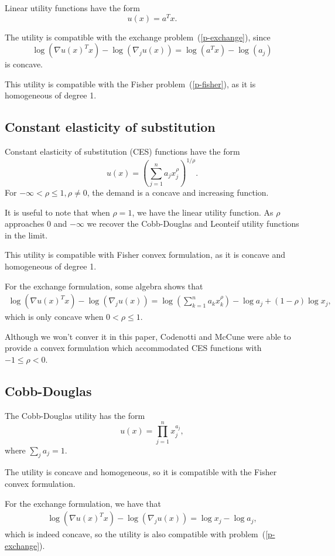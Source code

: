 \documentclass[12pt]{article}
\begin{document}
Linear utility functions have the form
\[
u(x) = a^T x.
\]

The utility is compatible with the exchange problem~(\ref{p-exchange}),
since
\[
\log(\nabla u(x)^T x) - \log(\nabla_j u(x))  = \log(a^T x) - \log(a_j)
\]
is concave.

This utility is compatible with the Fisher problem~(\ref{p-fisher}), as it is homogeneous of degree 1.


\subsection{Constant elasticity of substitution}
Constant elasticity of substitution (CES) functions have the form
\[
u(x) = \left(\sum_{j=1}^n a_j x_j^\rho \right)^{1/\rho}.
\]
For $-\infty < \rho \leq 1, \rho \neq 0$, the demand is a concave and
increasing function.

It is useful to note that when $\rho = 1$, we have the linear utility function. As $\rho$ approaches $0$ and $-\infty$ we recover the Cobb-Douglas and Leonteif
utility functions in the limit. %

This utility is compatible with Fisher convex formulation, as it is concave and homogeneous of degree 1.

For the exchange formulation, some algebra shows that 
\begin{align*}
\log(\nabla u(x)^T x) - \log(\nabla_j u(x)) =
\log\left(\sum_{k=1}^n a_k x_k^\rho \right) - \log a_j + (1-\rho) \log x_j,
\end{align*}
which is only concave when $0 < \rho \leq 1$.

Although we won't conver it in this paper, Codenotti and McCune \cite{codenotti2005marketCES} were able to provide a convex formulation which accommodated
CES functions with $-1 \leq \rho < 0$.

\subsection{Cobb-Douglas}
The Cobb-Douglas utility has the form
\[
u(x) = \prod_{j=1}^{n} x_j^{a_j},
\]
where $\sum_j a_j = 1$.


The utility is concave and homogeneous, so it is compatible with the Fisher
convex formulation.

For the exchange formulation, we have that
\begin{align*}
\log(\nabla u(x)^T x) - \log(\nabla_j u(x)) =
\log x_j - \log a_j,
\end{align*}
which is indeed concave, so the utility is also compatible with
problem~(\ref{p-exchange}).
\end{document}
